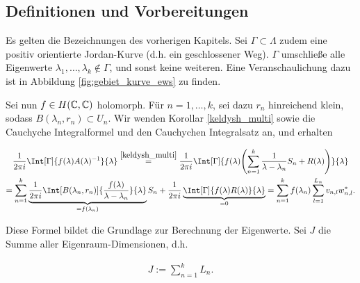 \subsection*{Definitionen und Vorbereitungen}

Es gelten die Bezeichnungen des vorherigen Kapitels.
Sei $\Gamma \subset \Lambda$ zudem eine positiv orientierte Jordan-Kurve (d.h. ein geschlossener Weg).
$\Gamma$ umschließe alle Eigenwerte $\lambda_1, \dots, \lambda_k \not \in \Gamma$, und sonst keine weiteren.
Eine Veranschaulichung dazu ist in Abbildung \ref{fig:gebiet_kurve_ews} zu finden.



Sei nun $f \in H(\mathbb{C}, \mathbb{C})$ holomorph.
Für $n = 1, \dots, k$, sei dazu $r_n$ hinreichend klein, sodass $B(\lambda_n, r_n) \subset U_n$.
Wir wenden Korollar \ref{keldysh_multi} sowie die Cauchyche Integralformel und den Cauchychen Integralsatz an, und erhalten

\begin{multline} \label{eq:cauchysche_integral_formel_satz}
    \frac{1}{2 \pi i}
    \Int[\Gamma]
    {
        f(\lambda) A(\lambda)^{-1}
    }{\lambda}
    \stackrel
    {
        \ref{keldysh_multi}
    }{=}
    \frac{1}{2 \pi i}
    \Int[\Gamma]
    {
        f(\lambda)
        \pbraces
        {
            \sum_{n=1}^k
                \frac{1}{\lambda - \lambda_n} S_n
                +
                R(\lambda)
        }
    }{\lambda} \\
    =
    \sum_{n=1}^k
        \underbrace
        {
            \frac{1}{2 \pi i}
            \Int[B(\lambda_n, r_n)]
            {
                \frac{f(\lambda)}{\lambda - \lambda_n}
            }{\lambda}
        }_{=f(\lambda_n)}
        S_n
    +
    \frac{1}{2 \pi i}
    \underbrace
    {
        \Int[\Gamma]
        {
            f(\lambda) R(\lambda)
        }{\lambda}
    }_{=0}
    =
    \sum_{n=1}^k
        f(\lambda_n)
        \sum_{l=1}^{L_n}
            v_{n, l} w_{n, l}^\ast.
\end{multline}

Diese Formel bildet die Grundlage zur Berechnung der Eigenwerte.
Sei $J$ die Summe aller Eigenraum-Dimensionen, d.h.

\begin{align*}
    J
    :=
    \sum_{n=1}^k
        L_n.
\end{align*}

\begin{comment}

    Für lineare Eigenwertprobleme würde weiters gelten

    \begin{align*}
        J
        \stackrel{!}{=}
        \sum_{n=1}^k
            \Def(A - I_N \lambda_n)
        =
        \dim
        \bigoplus_{n=1}^k
            \ker (A - I_N \lambda_n)
        \ll
        \dim \C^N
        =
        N.
    \end{align*}

\end{comment}

